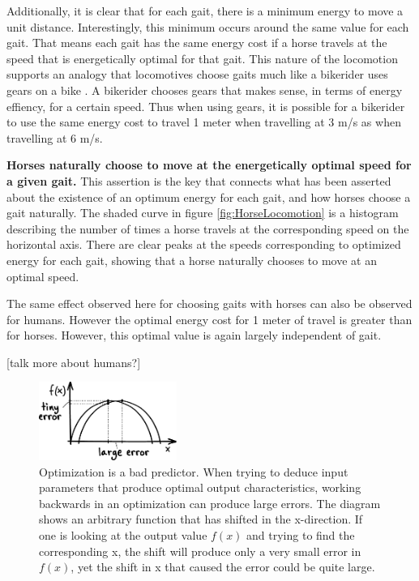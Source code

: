 Additionally, it is clear that for each gait, there is a minimum energy to move a unit distance. Interestingly, this minimum occurs around the same value for each gait. That means each gait has the same energy cost if a horse travels at the speed that is energetically optimal for that gait. This nature of the locomotion supports an analogy that locomotives choose gaits much like a bikerider uses gears on a bike \cite{nigg00}. A bikerider chooses gears that makes sense, in terms of energy effiency, for a certain speed. Thus when using gears, it is possible for a bikerider to use the same energy cost to travel 1 meter when travelling at 3 m/s as when travelling at 6 m/s.

\textbf{Horses naturally choose to move at the energetically optimal speed for a given gait.} This assertion is the key that connects what has been asserted about the existence of an optimum energy for each gait, and how horses choose a gait naturally. The shaded curve in figure \ref{fig:HorseLocomotion} is a histogram describing the number of times a horse travels at the corresponding speed on the horizontal axis. There are clear peaks at the speeds corresponding to optimized energy for each gait, showing that a horse naturally chooses to move at an optimal speed.

The same effect observed here for choosing gaits with horses can also be observed for humans. However the optimal energy cost for 1 meter of travel is greater than for horses. However, this optimal value is again largely independent of gait.

[talk more about humans?]

\begin{figure}[h]		%
\begin{centering}
\includegraphics[width=0.4\textwidth]{Figures/BadPredictor}\par
\end{centering}
\caption[Diagram: Optimization is a Bad Predictor]{Optimization is a bad predictor. When trying to deduce input parameters that produce optimal output characteristics, working backwards in an optimization can produce large errors. The diagram shows an arbitrary function that has shifted in the x-direction. If one is looking at the output value $f(x)$ and trying to find the corresponding x, the shift will produce only a very small error in $f(x)$, yet the shift in x that caused the error could be quite large.}
\label{fig:BadPredictor}
\end{figure}
%

